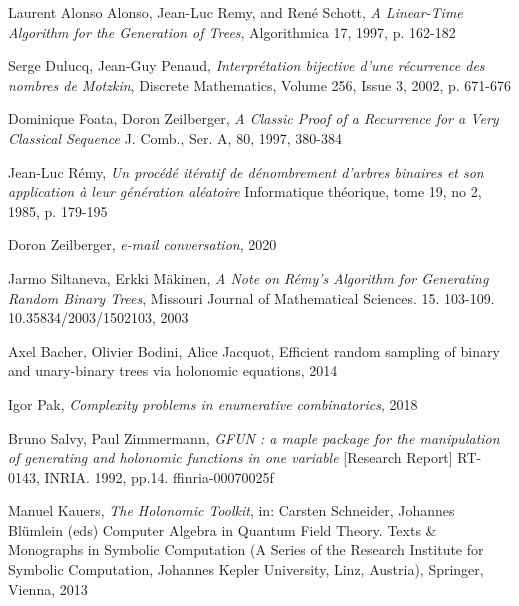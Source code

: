 \documentclass[final]{article}
\theoremstyle{definition}
\theoremstyle{remark}
\begin{document}
\begin{thebibliography}{9}
    Laurent Alonso Alonso, Jean-Luc Remy, and René Schott,
    \textit{A Linear-Time Algorithm for the Generation of Trees},
    Algorithmica 17,
    1997,
    p. 162-182

    Serge Dulucq, Jean-Guy Penaud,
    \textit{Interprétation bijective d'une récurrence des nombres de Motzkin},
    Discrete Mathematics,
    Volume 256, Issue 3,
    2002,
    p. 671-676

    Dominique Foata, Doron Zeilberger,
    \textit{A Classic Proof of a Recurrence for a Very Classical Sequence}
    J. Comb., Ser. A, 80,
    1997, 380-384

    Jean-Luc Rémy,
    \textit{Un procédé itératif de dénombrement d’arbres binaires et son application à leur génération aléatoire}
    Informatique théorique, tome 19, no 2, 
    1985,
    p. 179-195

    Doron Zeilberger,
    \textit{e-mail conversation},
    2020

    Jarmo Siltaneva, Erkki Mäkinen,
    \textit{A Note on Rémy's Algorithm for Generating Random Binary Trees},
    Missouri Journal of Mathematical Sciences. 15. 103-109. 10.35834/2003/1502103,
    2003 

    Axel Bacher, Olivier Bodini, Alice Jacquot,
    Efficient random sampling of binary and unary-binary trees via holonomic equations,
    2014

    Igor Pak,
    \textit{Complexity problems in enumerative combinatorics},
    2018

    Bruno Salvy, Paul Zimmermann,
    \textit{GFUN : a maple package for the manipulation of generating and holonomic functions in one variable}
    [Research Report] RT-0143, INRIA. 1992, pp.14. ffinria-00070025f

    Manuel Kauers,
    \textit{The Holonomic Toolkit},
    in: Carsten Schneider, Johannes Blümlein (eds) Computer Algebra in Quantum Field Theory. Texts \& Monographs in Symbolic Computation (A Series of the Research Institute for Symbolic Computation, Johannes Kepler University, Linz, Austria),
    Springer, Vienna,
    2013

\end{thebibliography}
\end{document}
